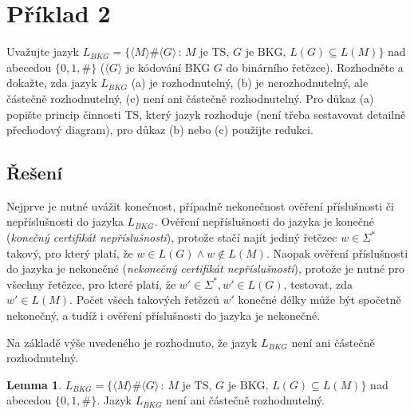 \documentclass[a4paper, 12pt]{article}
\theoremstyle{definition}
\theoremstyle{definition}
\theoremstyle{definition}
\newtheorem{lemma}[theorem]{Lemma}
\theoremstyle{remark}
\begin{document}
\section{Příklad 2}
Uvažujte jazyk $L_{BKG} = \{\langle M \rangle\#\langle G \rangle \, : \, M \text{ je TS, } G \text{ je BKG, } L(G) \subseteq L(M)\}$ nad abecedou $\{0, 1, \#\}$ ($\langle G \rangle$ je kódování BKG $G$ do binárního řetězce). Rozhodněte a dokažte, zda jazyk $L_{BKG}$ (a) je rozhodnutelný, (b) je nerozhodnutelný, ale částečně rozhodnutelný, (c) není ani částečně rozhodnutelný. Pro důkaz (a) popište princip činnosti TS, který jazyk rozhoduje (není třeba sestavovat detailně přechodový diagram), pro důkaz (b) nebo (c) použijte redukci.

\subsection{Řešení}
Nejprve je nutné uvážit konečnost, případně nekonečnost ověření příslušnosti či nepříslušnosti do jazyka $L_{BKG}$. Ověření nepříslušnosti do jazyka je konečné (\textit{konečný certifikát nepříslušnosti}), protože stačí najít jediný řetězec $w \in \Sigma^\ast$ takový, pro který platí, že $w \in L(G) \wedge w \notin L(M)$. Naopak ověření příslušnosti do jazyka je nekonečné (\textit{nekonečný certifikát nepříslušnosti}), protože je nutné pro všechny řetězce, pro které platí, že $w' \in \Sigma^\ast, w' \in L(G)$, testovat, zda $w' \in L(M)$. Počet všech takových řetězců $w'$ konečné délky může být spočetně nekonečný, a tudíž i ověření příslušnosti do jazyka je nekonečné.

Na základě výše uvedeného je rozhodnuto, že jazyk $L_{BKG}$ není ani částečně rozhodnutelný.

\begin{lemma}
    $L_{BKG} = \{\langle M \rangle\#\langle G \rangle \, : \, M \text{ je TS, } G \text{ je BKG, } L(G) \subseteq L(M)\}$ nad abecedou $\{0, 1, \#\}$. Jazyk $L_{BKG}$ není ani částečně rozhodnutelný.
\end{lemma}
\end{document}
